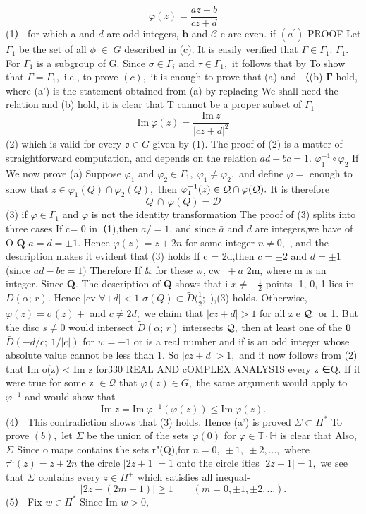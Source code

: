 $$ \varphi(z)={\frac{a z+b}{c z+d}} $$ (1） for which a and $d$ are odd integers, ${\boldsymbol{b}}$ and $\scriptstyle{\mathcal{C}}$ c are even. if $\left(a^{\prime}\right)$ PROOF Let ${\Gamma_{1}}$ be the set of all $\scriptstyle\phi\;\in\;G$ described in (c). It is easily verified that $\Gamma\in\Gamma_{1}.$ ${\Gamma_{1}}.$ For ${\Gamma_{1}}$ is a subgroup of G. Since $\sigma\in\Gamma_{i}$ and $\tau\in\Gamma_{1},$ it follows that by To show that $\Gamma=\Gamma_{1},$ i.e., to prove $(c),$ it is enough to prove that (a) and （(b) ${\boldsymbol{\Gamma}}$ hold, where (a') is the statement obtained from (a) by replacing We shall need the relation and (b) hold, it is clear that T cannot be a proper subset of ${\Gamma_{1}}$ $$ \mathrm{Im~}\varphi(z)={\frac{\mathrm{Im~}z}{|c z+d|^{2}}} $$ (2) which is valid for every ${\mathfrak{o}}\in G$ given by (1). The proof of (2) is a matter of straightforward computation, and depends on the relation $a d-b c=1.$ $\varphi_{1}^{-1}\circ\varphi_{2}$ If We now prove (a) Suppose $\varphi_{1}$ and $\varphi_{2}\in\Gamma_{1},\;\varphi_{1}\neq\varphi_{2},$ and define $\varphi=$ enough to show that $z\in\varphi_{1}(Q)\cap\varphi_{2}(Q),$ then $\varphi_{1}^{-1}(z)\in{\cal Q}\cap\varphi({\cal Q}).$ It is therefore $$ Q\,\cap\,\varphi(Q)=\mathcal{D} $$ (3) if $\varphi\in\Gamma_{1}$ and $\varphi$ is not the identity transformation The proof of (3) splits into three cases If c= 0 in（1),then $\scriptstyle a/=1.$ and since $\bar{a}$ and $d$ are integers,we have of O ${\boldsymbol{Q}}$ $a=d=\pm1.$ Hence $\varphi(z)=z+2n$ for some integer $n\neq0,$ , and the description makes it evident that (3) holds If c = 2d,then $c=\pm2$ and $d=\pm1$ (since $a d-b c=1)$ Therefore If & for these w, cw $\ \!+\!a$ 2m, where m is an integer. Since ${\boldsymbol{Q}}.$ The description of ${\boldsymbol{Q}}$ shows that i $\textstyle x\neq-{\frac{1}{2}}$ points -1, 0, 1 lies in $D(\alpha;\,r).$ Hence |cv $\forall+d|<1$ $\sigma(Q)\subset{\tilde{D}}(_{2}^{1};$ ),(3) holds. Otherwise, $\varphi(z)=\sigma(z)+$ and $c\neq2d,$ we claim that $|c z+d|>1$ for all z e ${\cal Q}.$ or 1. But the disc $\scriptstyle{s\neq0}$ would intersect ${\tilde{D}}(\alpha;\,r)$ intersects ${\cal Q},$ then at least one of the $\mathbf{0}$ ${\bar{D}}(-d/c;\ 1/|c|)$ for $w=-1$ or is a real number and if is an odd integer whose absolute value cannot be less than 1. So $|c z+d|>1,$ and it now follows from (2) that Im o(z) < Im z for330 REAL AND cOMPLEX ANALYS1S every z ∈Q. If it were true for some z $\in{\mathcal{Q}}$ that $\varphi(z)\in G,$ the same argument would apply to $\varphi^{-1}$ and would show that $$ \mathrm{Im~}z=\mathrm{Im~}\varphi^{-1}(\varphi(z))\leq\mathrm{Im~}\varphi(z). $$ (4） This contradiction shows that (3) holds. Hence (a') is proved $\Sigma\subset\Pi^{*}$ To prove $(b),$ let $\Sigma$ be the union of the sets $\scriptstyle{\varphi(0)}$ for $\varphi\in\mathbb{T}\cdot\mathbb{H}$ is clear that Also, $\Sigma_{}^{}$ Since o maps contains the sets r"(Q),for $n=0,~\pm1,~\pm2,\ldots,$ where $\tau^{n}(z)=z+2n$ the circle $|2z+1|=1$ onto the circle ities $|2z-1|=1,$ we see that $\Sigma_{}^{}$ contains every $z\in\Pi^{+}$ which satisfies all inequal- $$ |2z-(2m+1)|\geq1\qquad(m=0,\pm1,\pm2,\ldots). $$ (5） Fix $w\in\Pi^{*}$ Since Im $w>0,$ 
